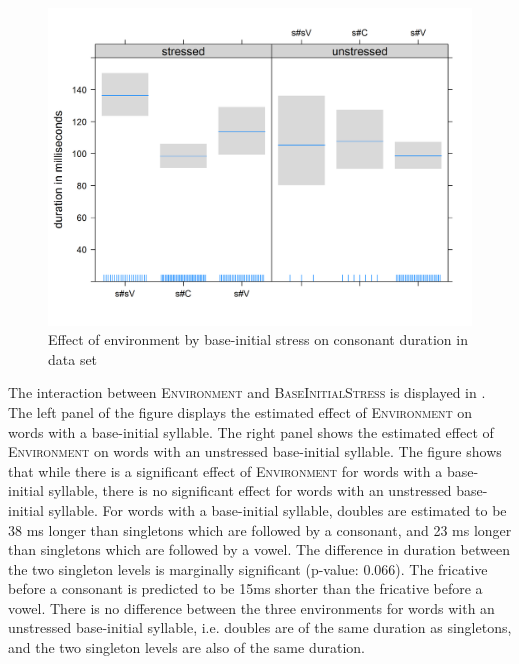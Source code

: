 \begin{figure}

	
	\includegraphics [scale=0.5]{images/Corpus/disModelTransitionTypeByStress.png}
	\caption{Effect of environment by base-initial stress on consonant duration in data set}
	\label{fig:corpus main effect 1 dis}
\end{figure}

The interaction between \textsc{Environment} and \textsc{BaseInitialStress} is displayed in . The left panel of the figure displays the estimated effect of \textsc{Environment} on words with a  base-initial syllable. The right panel shows the estimated effect of \textsc{Environment} on words with an unstressed base-initial syllable. The figure shows that while there is a significant effect of \textsc{Environment} for words with a  base-initial syllable, there is no significant effect for words with an unstressed base-initial syllable. For words with a  base-initial syllable, doubles are estimated to be 38 ms  longer than singletons which are followed by a consonant, and 23 ms longer than singletons which are followed by a vowel. 
The difference in duration between the two singleton levels is marginally significant (p-value: $0.066$). The fricative before a consonant is predicted to be 15ms shorter than the fricative before a vowel.  There is no difference between the three environments for words with an unstressed base-initial syllable, i.e. doubles are of the same duration as singletons, and the two singleton levels are  also of the same duration. 


